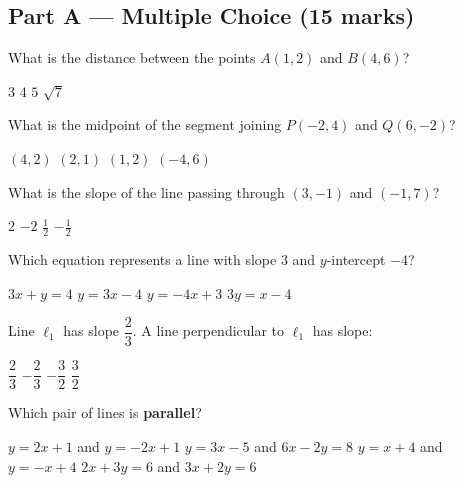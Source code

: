 \documentclass[addpoints]{exam}
\begin{document}
\newpage
\begin{questions}

\section*{Part A --- Multiple Choice (15 marks)}
\vspace{5mm}

\question[1] What is the distance between the points $A(1, 2)$ and $B(4, 6)$?
\begin{choices}
    \choice $3$
    \choice $4$
    \correctchoice $5$
    \choice $\sqrt{7}$
\end{choices}
\vspace{3mm}

\question[1] What is the midpoint of the segment joining $P(-2, 4)$ and $Q(6, -2)$?
\begin{choices}
    \choice $(4, 2)$
    \correctchoice $(2, 1)$
    \choice $(1, 2)$
    \choice $(-4, 6)$
\end{choices}
\vspace{3mm}

\question[1] What is the slope of the line passing through $(3, -1)$ and $(-1, 7)$?
\begin{choices}
    \choice $2$
    \correctchoice $-2$
    \choice $\tfrac{1}{2}$
    \choice $-\tfrac{1}{2}$
\end{choices}
\vspace{3mm}

\question[1] Which equation represents a line with slope $3$ and $y$-intercept $-4$?
\begin{choices}
    \choice $3x + y = 4$
    \correctchoice $y = 3x - 4$
    \choice $y = -4x + 3$
    \choice $3y = x - 4$
\end{choices}
\vspace{3mm}

\question[1] Line $\ell_1$ has slope $\dfrac{2}{3}$. A line perpendicular to $\ell_1$ has slope:
\begin{choices}
    \choice $\dfrac{2}{3}$
    \choice $-\dfrac{2}{3}$
    \correctchoice $-\dfrac{3}{2}$
    \choice $\dfrac{3}{2}$
\end{choices}
\vspace{3mm}

\question[1] Which pair of lines is \textbf{parallel}?
\begin{choices}
    \choice $y = 2x + 1$ and $y = -2x + 1$
    \correctchoice $y = 3x - 5$ and $6x - 2y = 8$
    \choice $y = x + 4$ and $y = -x + 4$
    \choice $2x + 3y = 6$ and $3x + 2y = 6$
\end{choices}
\vspace{3mm}


\end{questions}
\end{document}
